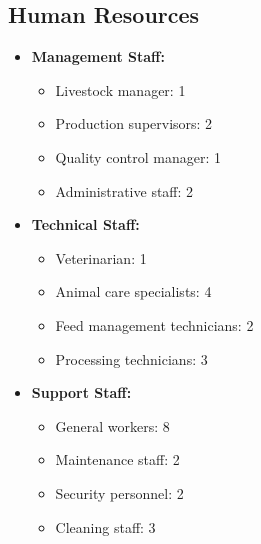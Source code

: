 \subsection{Human Resources}
\begin{itemize}
    \item \textbf{Management Staff:}
    \begin{itemize}
        \item Livestock manager: 1
        \item Production supervisors: 2
        \item Quality control manager: 1
        \item Administrative staff: 2
    \end{itemize}
    
    \item \textbf{Technical Staff:}
    \begin{itemize}
        \item Veterinarian: 1
        \item Animal care specialists: 4
        \item Feed management technicians: 2
        \item Processing technicians: 3
    \end{itemize}
    
    \item \textbf{Support Staff:}
    \begin{itemize}
        \item General workers: 8
        \item Maintenance staff: 2
        \item Security personnel: 2
        \item Cleaning staff: 3
    \end{itemize}
\end{itemize}

